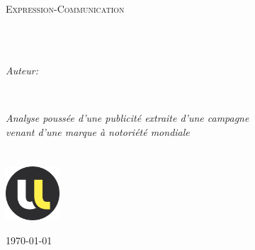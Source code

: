 \documentclass[
12pt, 
french, 
singlespacing,
headsepline,
]{Analyse}
\author{Alexandre \textsc{GERARD}}
\begin{document}
\frontmatter

\pagestyle{plain}


\begin{titlepage}
\begin{center}

\vspace*{.05\textheight}
{\scshape\LARGE \univname\par}\vspace{1.5cm}
\textsc{\Large Expression-Communication}\\[0.5cm]

\HRule \\[0.4cm]
{\huge \bfseries \ttitle\par}\vspace{0.4cm}
\HRule \\[1.5cm]
 
\begin{minipage}[t]{1\textwidth}
\begin{center} \large
\emph{Auteur:}\\
\href{https://agerard57.github.io/}{\authorname}
\end{center}
\end{minipage}
\begin{minipage}[t]{0.4\textwidth}
\end{minipage}\\[3cm]
 
\vfill

\large \textit{Analyse poussée d'une publicité extraite d'une campagne \\ venant d'une marque à notoriété mondiale }\\[0.3cm]
\vspace*{15mm}
\groupname\\\deptname\\[2cm]
\includegraphics[width=20mm]{medias/ul.png}

\vfill

{\large \today}\\[4cm]

 
\vfill
\end{center}
\end{titlepage}
\end{document}
